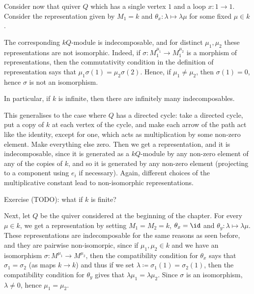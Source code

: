 Consider now that quiver $Q$ which has a single vertex $1$ and a loop $x\colon 1\to 1$.
Consider the representation given by $M_1 = k$ and $\theta_x\colon \lambda\mapsto \lambda\mu$
for some fixed $\mu \in k$.

The corresponding $kQ$-module is indecomposable, and for distinct $\mu_1, \mu_2$
these representations are not isomorphic. Indeed, if
$\sigma\colon M_1^{\mu_1}\to M_1^{\mu_2}$ is a morphism of representations, then
the commutativity condition in the definition of representation says that
$\mu_1\sigma(1) = \mu_2\sigma(2)$. Hence, if $\mu_1\neq \mu_2$, then $\sigma(1) = 0$,
hence $\sigma$ is not an isomorphism.

In particular, if $k$ is infinite, then there are infinitely many
indecomposables.

This generalises to the case where $Q$ has a directed cycle: take a directed
cycle, put a copy of $k$ at each vertex of the cycle, and make each arrow of the
path act like the identity, except for one, which acts as multiplication by some
non-zero element. Make
everything else zero. Then we get a representation, and it is indecomposable, since
it is generated as a $kQ$-module by any non-zero element of any of the copies of
$k$, and so it is generated by any non-zero element (projecting to a component using
$e_i$ if necessary). Again, different choices of the multiplicative constant lead to non-isomorphic
representations.

Exercise (TODO): what if $k$ is finite?


Next, let $Q$ be the quiver considered at the beginning of the chapter. For
every $\mu \in k$, we get a representation by setting $M_1 = M_2 = k$,
$\theta_x = \id$ and $\theta_y\colon \lambda\mapsto \lambda\mu$. These representations
are indecomposable for the same reasons as seen before, and they are pairwise
non-isomorpic, since if $\mu_1, \mu_2 \in k$ and we have an isomorphism
$\sigma\colon M^{\mu_1}\to M^{\mu_2}$, then the compatibility condition for
$\theta_x$ says that $\sigma_1 = \sigma_2$ (as maps $k\to k$) and thus if we set
$\lambda\coloneqq \sigma_1(1) = \sigma_2(1)$, then the compatibility condition
for $\theta_y$ gives that $\lambda\mu_1 = \lambda\mu_2$. Since $\sigma$ is an
isomorphism, $\lambda\neq 0$, hence $\mu_1=\mu_2$.
